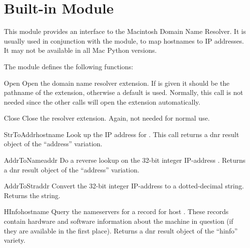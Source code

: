 \section{Built-in Module }



This module provides an interface to the Macintosh Domain Name
Resolver.  It is usually used in conjunction with the 
module, to map hostnames to IP addresses.  It may not be available in
all Mac Python versions.

The  module defines the following functions:


\begin{funcdesc}{Open}{}
Open the domain name resolver extension.  If  is given it
should be the pathname of the extension, otherwise a default is
used.  Normally, this call is not needed since the other calls will
open the extension automatically.
\end{funcdesc}

\begin{funcdesc}{Close}{}
Close the resolver extension.  Again, not needed for normal use.
\end{funcdesc}

\begin{funcdesc}{StrToAddr}{hostname}
Look up the IP address for .  This call returns a dnr
result object of the ``address'' variation.
\end{funcdesc}

\begin{funcdesc}{AddrToName}{addr}
Do a reverse lookup on the 32-bit integer IP-address
.  Returns a dnr result object of the ``address'' variation.
\end{funcdesc}

\begin{funcdesc}{AddrToStr}{addr}
Convert the 32-bit integer IP-address  to a dotted-decimal
string.  Returns the string.
\end{funcdesc}

\begin{funcdesc}{HInfo}{hostname}
Query the nameservers for a  record for host
.  These records contain hardware and software
information about the machine in question (if they are available in
the first place).  Returns a dnr result object of the ``hinfo''
variety.
\end{funcdesc}

